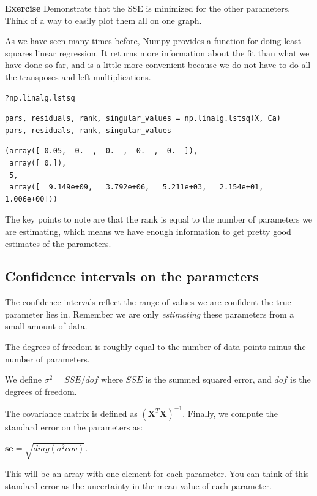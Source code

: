 \documentclass[11pt]{article}
\begin{document}
\textbf{Exercise} Demonstrate that the SSE is minimized for the other parameters. Think of a way to easily plot them all on one graph.

As we have seen many times before, Numpy provides a function for doing least squares linear regression. It returns more information about the fit than what we have done so far, and is a little more convenient because we do not have to do all the transposes and left multiplications.

\begin{verbatim}
?np.linalg.lstsq
\end{verbatim}

\begin{verbatim}
pars, residuals, rank, singular_values = np.linalg.lstsq(X, Ca)
pars, residuals, rank, singular_values
\end{verbatim}

\begin{verbatim}
(array([ 0.05, -0.  ,  0.  , -0.  ,  0.  ]),
 array([ 0.]),
 5,
 array([  9.149e+09,   3.792e+06,   5.211e+03,   2.154e+01,   1.006e+00]))
\end{verbatim}

The key points to note are that the rank is equal to the number of parameters we are estimating, which means we have enough information to get pretty good estimates of the parameters.

\subsection{Confidence intervals on the parameters}
\label{sec:org6692689}

The confidence intervals reflect the range of values we are confident the true parameter lies in. Remember we are only \emph{estimating} these parameters from a small amount of data.

The degrees of freedom is roughly equal to the number of data points minus the number of parameters.

We define \(\sigma^2 = SSE / dof\) where \(SSE\) is the summed squared error, and \(dof\) is the degrees of freedom.

The covariance matrix is defined as \((\mathbf{X}^T \mathbf{X})^{-1}\). Finally, we compute the standard error on the parameters as:

\(\mathbf{se} = \sqrt{diag(\sigma^2 cov)}\).

This will be an array with one element for each parameter. You can think of this standard error as the uncertainty in the mean value of each parameter.
\end{document}
